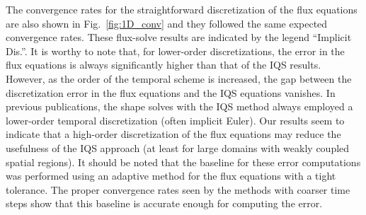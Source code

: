 \documentclass{elsarticle}
\newcommand{\fig}[1]{Fig.~\ref{#1}}                      %
\begin{document}
The convergence rates for the straightforward discretization of the flux equations are also shown in \fig{fig:1D_conv} and they followed the same expected convergence rates. These flux-solve results are indicated by the legend ``Implicit Dis.''. It is worthy to note that, for lower-order discretizations, the error in the flux equations is always significantly higher than that of the IQS results. However, as the order of the temporal scheme is increased, the gap between the discretization error in the flux equations and the IQS equations vanishes. In previous publications, the shape solves with the IQS method always employed a lower-order temporal discretization (often implicit Euler). Our results seem to indicate that a high-order discretization of the flux equations may reduce the usefulness of the IQS approach (at least for large domains with weakly coupled spatial regions). 
It should be noted that the baseline for these error computations was performed using an adaptive method for the flux equations with a tight tolerance. The proper convergence rates seen by the methods with coarser time steps show that this baseline is accurate enough for computing the error.
\end{document}
